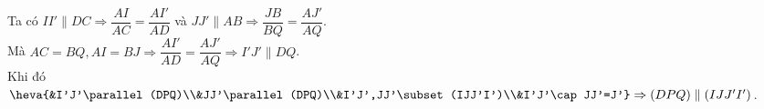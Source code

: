 \begin{bt}
{\begin{enumerate}
	Ta có $II'\parallel DC\Rightarrow\dfrac{AI}{AC}=\dfrac{AI'}{AD}$ và 	$JJ'\parallel AB\Rightarrow\dfrac{JB}{BQ}=\dfrac{AJ'}{AQ}$.\\
	Mà $AC=BQ, AI=BJ\Rightarrow\dfrac{AI'}{AD}=\dfrac{AJ'}{AQ}\Rightarrow I'J'\parallel DQ$.\\
	Khi đó $\heva{&I'J'\parallel(DPQ)\\&JJ'\parallel(DPQ)\\&I'J',JJ'\subset(IJJ'I')\\&I'J'\cap JJ'=J'}\Rightarrow(DPQ)\parallel(IJJ'I')$.
\end{enumerate}}
\end{bt}

\begin{bt}%


\end{bt}
